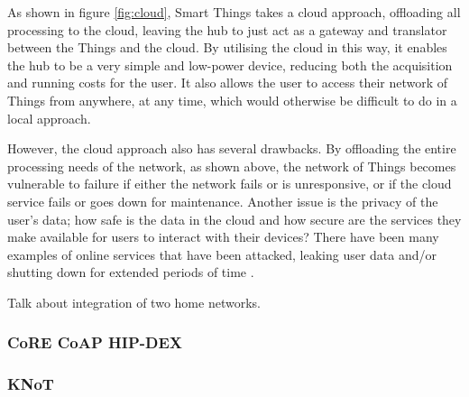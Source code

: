 As shown in figure \ref{fig:cloud}, Smart Things takes a cloud approach, offloading all processing to the cloud, leaving the hub to just act as a gateway and translator between the Things and the cloud. By utilising the cloud in this way, it enables the hub to be a very simple and low-power device, reducing both the acquisition and running costs for the user. It also allows the user to access their network of Things from anywhere, at any time, which would otherwise be difficult to do in a local approach. 

However, the cloud approach also has several drawbacks. By offloading the entire processing needs of the network, as shown above, the network of Things becomes vulnerable to failure if either the network fails or is unresponsive, or if the cloud service fails or goes down for maintenance. Another issue is the privacy of the user's data; how safe is the data in the cloud and how secure are the services they make available for users to interact with their devices? There have been many examples of online services that have been attacked, leaking user data and/or shutting down for extended periods of time \cite{Playstation, Amazon, Google}.

Talk about integration of two home networks.



\subsubsection{CoRE CoAP HIP-DEX} %
\label{ssub:core_coap}

\subsubsection{KNoT} %
\label{ssub:knot}

